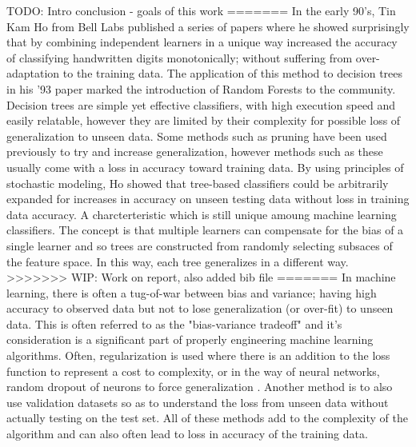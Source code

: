 \documentclass{article} %
\begin{document}
TODO: Intro conclusion - goals of this work
=======
In the early 90's, Tin Kam Ho from Bell Labs published a series of papers where he showed surprisingly that by combining independent learners in a unique way increased the accuracy of classifying handwritten digits monotonically; without suffering from over-adaptation to the training data. \cite{Ho93, Ho95, Ho98} The application of this method to decision trees in his '93 paper marked the introduction of Random Forests to the community. \cite{Ho93} Decision trees are simple yet effective classifiers, with high execution speed and easily relatable, however they are limited by their complexity for possible loss of generalization to unseen data. Some methods such as pruning have been used previously to try and increase generalization, however methods such as these usually come with a loss in accuracy toward training data. By using principles of stochastic modeling, Ho showed that tree-based classifiers could be arbitrarily expanded for increases in accuracy on unseen testing data without loss in training data accuracy. A charcterteristic which is still unique amoung machine learning classifiers. The concept is that multiple learners can compensate for the bias of a single learner and so trees are constructed from randomly selecting subsaces of the feature space. In this way, each tree generalizes in a different way. 
>>>>>>> WIP: Work on report, also added bib file
=======
In machine learning, there is often a tug-of-war between bias and variance; having high accuracy to observed data but not to lose generalization (or over-fit) to unseen data. This is often referred to as the "bias-variance tradeoff" and it's consideration is a significant part of properly engineering machine learning algorithms. Often, regularization is used where there is an addition to the loss function to represent a cost to complexity, or in the way of neural networks, random dropout of neurons to force generalization \cite{Srivastava2014}. Another method is to also use validation datasets so as to understand the loss from unseen data without actually testing on the test set. All of these methods add to the complexity of the algorithm and can also often lead to loss in accuracy of the training data.\\
\end{document}
